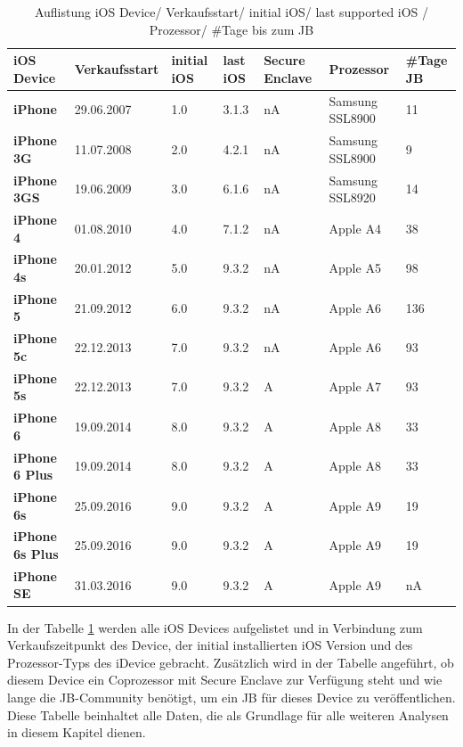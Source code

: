 \begin{table}[htp!]
    \begin{center}
        \begin{tabular}{|p{30mm}|p{27mm}|p{12mm}|p{10mm}|p{18mm}|p{2cm}|p{15mm}|} \hline
            \textbf{iOS Device} & \textbf{Verkaufsstart} & \textbf{initial iOS} & \textbf{last iOS} & \textbf{Secure Enclave} & \textbf{Prozessor}  & \textbf{\#Tage JB} \\ \hline
            \textbf{iPhone} & 29.06.2007  & 1.0 & 3.1.3 & nA & Samsung SSL8900 & 11\\ \hline
            \textbf{iPhone 3G} & 11.07.2008 & 2.0 & 4.2.1 & nA & Samsung SSL8900 & 9\\ \hline
            \textbf{iPhone 3GS} & 19.06.2009 & 3.0 & 6.1.6 & nA & Samsung SSL8920 & 14\\ \hline
            \textbf{iPhone 4} & 01.08.2010 & 4.0 & 7.1.2 & nA & Apple A4 & 38 \\ \hline
            \textbf{iPhone 4s} & 20.01.2012 & 5.0 & 9.3.2 & nA & Apple A5 & 98 \\ \hline 
            \textbf{iPhone 5} & 21.09.2012 & 6.0 &  9.3.2 & nA & Apple A6 & 136 \\ \hline
            \textbf{iPhone 5c} & 22.12.2013 & 7.0 & 9.3.2 & nA & Apple A6 & 93 \\ \hline
            \textbf{iPhone 5s} & 22.12.2013 & 7.0 & 9.3.2 & A & Apple A7 & 93 \\ \hline
            \textbf{iPhone 6} & 19.09.2014 & 8.0 & 9.3.2 & A & Apple A8 & 33\\ \hline
            \textbf{iPhone 6 Plus} & 19.09.2014 & 8.0 & 9.3.2 &  A & Apple A8 & 33\\ \hline
            \textbf{iPhone 6s} & 25.09.2016 & 9.0 &  9.3.2 & A & Apple A9 & 19\\ \hline
            \textbf{iPhone 6s Plus} & 25.09.2016 & 9.0 & 9.3.2 &  A & Apple A9 & 19\\ \hline
            \textbf{iPhone SE} & 31.03.2016 & 9.0 &  9.3.2 & A & Apple A9 & nA\\ \hline  
        \end{tabular} 
        \caption{Auflistung iOS Device/ Verkaufsstart/ initial iOS/ last supported iOS / Prozessor/ \#Tage bis zum JB \protect\footnotemark}
        \label{tab:iOSHW}
    \end{center}
\end{table}

In der Tabelle \ref{tab:iOSHW} werden alle iOS Devices aufgelistet und in Verbindung zum Verkaufszeitpunkt des Device, der initial installierten iOS Version und des Prozessor-Typs des iDevice gebracht. Zusätzlich wird in der Tabelle angeführt, ob diesem Device ein Coprozessor mit Secure Enclave zur Verfügung steht und wie lange die JB-Community benötigt, um ein JB für dieses Device zu veröffentlichen. Diese Tabelle beinhaltet alle Daten, die als Grundlage für alle weiteren Analysen in diesem Kapitel dienen.\par


